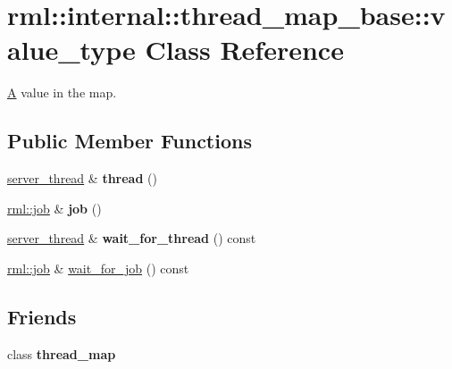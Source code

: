 \hypertarget{classrml_1_1internal_1_1thread__map__base_1_1value__type}{}\section{rml\+:\+:internal\+:\+:thread\+\_\+map\+\_\+base\+:\+:value\+\_\+type Class Reference}
\label{classrml_1_1internal_1_1thread__map__base_1_1value__type}


\hyperlink{structA}{A} value in the map.  


\subsection*{Public Member Functions}
\begin{DoxyCompactItemize}
\item 
\hypertarget{classrml_1_1internal_1_1thread__map__base_1_1value__type_ad012ad1869987da59dce5750c4388e81}{}\hyperlink{classrml_1_1internal_1_1server__thread}{server\+\_\+thread} \& {\bfseries thread} ()\label{classrml_1_1internal_1_1thread__map__base_1_1value__type_ad012ad1869987da59dce5750c4388e81}

\item 
\hypertarget{classrml_1_1internal_1_1thread__map__base_1_1value__type_a1f5d3a9f5720fb1dbd13f5877a7bdb15}{}\hyperlink{classrml_1_1job}{rml\+::job} \& {\bfseries job} ()\label{classrml_1_1internal_1_1thread__map__base_1_1value__type_a1f5d3a9f5720fb1dbd13f5877a7bdb15}

\item 
\hypertarget{classrml_1_1internal_1_1thread__map__base_1_1value__type_aace2645422748264644fe3025410aa78}{}\hyperlink{classrml_1_1internal_1_1server__thread}{server\+\_\+thread} \& {\bfseries wait\+\_\+for\+\_\+thread} () const \label{classrml_1_1internal_1_1thread__map__base_1_1value__type_aace2645422748264644fe3025410aa78}

\item 
\hyperlink{classrml_1_1job}{rml\+::job} \& \hyperlink{classrml_1_1internal_1_1thread__map__base_1_1value__type_a948cd9f2a5118194edb952dfb370bc91}{wait\+\_\+for\+\_\+job} () const 
\end{DoxyCompactItemize}
\subsection*{Friends}
\begin{DoxyCompactItemize}
\item 
\hypertarget{classrml_1_1internal_1_1thread__map__base_1_1value__type_aaaf376618c914d70fbb2419523962de3}{}class {\bfseries thread\+\_\+map}\label{classrml_1_1internal_1_1thread__map__base_1_1value__type_aaaf376618c914d70fbb2419523962de3}

\end{DoxyCompactItemize}


